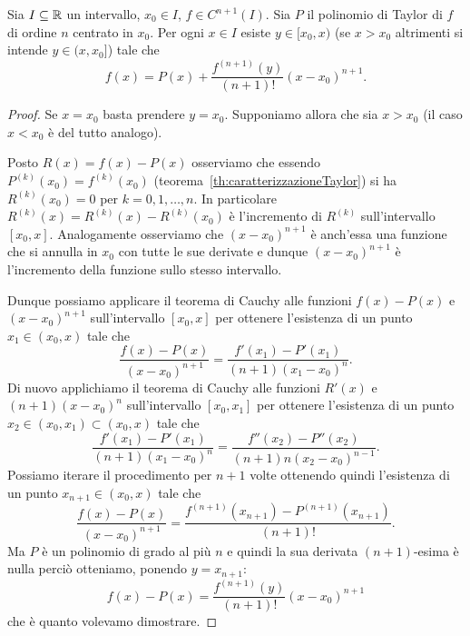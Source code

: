 \begin{theorem}
\label{th:taylor_lagrange}%
\mymark{**}%
%
%
Sia $I\subseteq {\mathbb R}$ un intervallo, $x_0\in I$, $f\in C^{n+1}(I)$.
Sia $P$ il polinomio di Taylor di $f$ di ordine $n$ centrato in $x_0$.
Per ogni $x\in I$ esiste $y\in [x_0,x)$
(se $x>x_0$ altrimenti si intende $y\in (x,x_0]$) tale che
\[
  f(x) = P(x) + \frac{f^{(n+1)}(y)}{(n+1)!}(x-x_0)^{n+1}.
\]
\end{theorem}
%
\begin{proof}\mymark{*}%
Se $x=x_0$ basta prendere $y=x_0$.
Supponiamo allora che sia $x>x_0$ (il caso $x<x_0$ è del tutto analogo).

Posto $R(x) = f(x)-P(x)$ osserviamo che essendo $P^{(k)}(x_0) = f^{(k)}(x_0)$
(teorema~\ref{th:caratterizzazioneTaylor})
si ha $R^{(k)}(x_0) = 0$ per $k=0,1, \dots, n$.
In particolare $R^{(k)}(x) = R^{(k)}(x)-R^{(k)}(x_0)$ è l'incremento di $R^{(k)}$
sull'intervallo $[x_0,x]$.
Analogamente osserviamo che $(x-x_0)^{n+1}$ è anch'essa
una funzione che si annulla in $x_0$ con tutte le sue derivate
e dunque $(x-x_0)^{n+1}$ è
l'incremento della funzione sullo stesso intervallo.

Dunque possiamo applicare il teorema di Cauchy alle funzioni
$f(x)-P(x)$ e $(x-x_0)^{n+1}$ sull'intervallo $[x_0,x]$ per ottenere
l'esistenza di un punto $x_1\in (x_0,x)$ tale che
\[
  \frac{f(x)-P(x)}{(x-x_0)^{n+1}}
  = \frac{f'(x_1)-P'(x_1)}{(n+1)(x_1-x_0)^n}.
\]
Di nuovo applichiamo il teorema di Cauchy alle funzioni $R'(x)$ e $(n+1)(x-x_0)^n$ sull'intervallo $[x_0,x_1]$ per ottenere
l'esistenza di un punto $x_2\in(x_0,x_1)\subset(x_0,x)$ tale che
\[
\frac{f'(x_1)-P'(x_1)}{(n+1)(x_1-x_0)^n} = \frac{f''(x_2)-P''(x_2)}{(n+1)n(x_2-x_0)^{n-1}}.
\]
Possiamo iterare il procedimento per $n+1$ volte ottenendo quindi
l'esistenza di
un punto $x_{n+1}\in(x_0,x)$ tale che
\[
  \frac{f(x)-P(x)}{(x-x_0)^{n+1}} = \frac{f^{(n+1)}(x_{n+1}) - P^{(n+1)}(x_{n+1})}{(n+1)!}.
\]
Ma $P$ è un polinomio di grado al più $n$ e quindi la sua derivata $(n+1)$-esima è nulla
perciò otteniamo, ponendo $y=x_{n+1}$:
\[
f(x) - P(x) = \frac{f^{(n+1)}(y)}{(n+1)!}(x-x_0)^{n+1}
\]
che è quanto volevamo dimostrare.
\end{proof}

